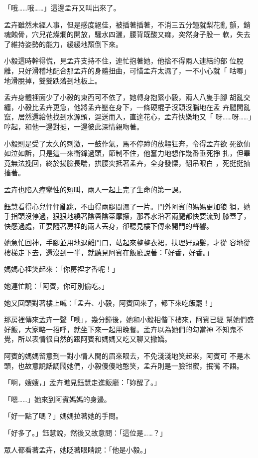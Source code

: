 「哦……哦……」這邊孟卉又叫出來了。

孟卉雖然未經人事，但是感度絕佳，被插著插著，不消三五分鐘就梨花亂
顫，銷魂蝕骨，穴兒花燦爛的開放，騷水四灑，腰背既酸又痲，突然身子股一
軟，失去了維持姿勢的能力，緩緩地頹倒下來。

小毅這時幹得慌，見孟卉支持不住，連忙抱著她，他捨不得兩人連結的部
位脫離，只好滑稽地配合那孟卉的身體扭曲，可惜孟卉太濕了，一不小心就「
咕唧」地滑脫掉，雙雙跌落到地板上。

孟卉身體裡面少了小毅的東西可不依了，她轉身抱緊小毅，兩人八隻手腳
胡亂交纏，小毅比孟卉更急，他將孟卉壓在身下，一條硬棍子沒頭沒腦地在孟
卉腿間亂竄，居然還給他找到水源頭，逕送而入，直達花心，孟卉快樂地又「
呀……呀……」哼起，和他一邊對挺，一邊彼此深情親吻著。

小毅則是受了太久的刺激，一鼓作氣，馬不停蹄的放韁狂奔，令得孟卉欲
死欲仙如泣如訴，只是這一來衝鋒過頭，節制不住，他奮力地想作幾番垂死掙
扎，但畢竟無法挽回，終於揚臉長喘，拱腰突抵著孟卉，全身發慄，翻吊眼白
，死挺挺抽搐著。

孟卉也陷入痙攣性的短叫，兩人一起上完了生命的第一課。

鈺慧看得心兒怦怦亂跳，不由得兩腿間濕了一片。門外阿賓的媽媽更加狼
狽，她手指頭沒停過，狠狠地繞著陰唇陰蒂摩擦，那春水沿著兩腿都快要流到
膝蓋了，快感過處，正要隨著房裡的兩人丟身，卻聽見樓下傳來開門的聲響。

她急忙回神，手腳並用地退離門口，站起來整整衣裙，扶理好頭髮，才從
容地從樓梯走下去，還沒到一半，就聽見阿賓在飯廳說著：「好香，好香。」

媽媽心裡笑起來：「你房裡才香呢！」

她連忙說：「阿賓，你可別偷吃。」

她又回頭對著樓上喊：「孟卉、小毅，阿賓回來了，都下來吃飯罷！」

那房裡傳來孟卉一聲「噢」，幾分鐘後，她和小毅相偕下樓來，阿賓已經
幫她們盛好飯，大家略一招呼，就坐下來一起用晚餐。孟卉以為她們的勾當神
不知鬼不覺，所以表情很自然的跟阿賓和媽媽又吃又聊又撒嬌。

阿賓的媽媽留意到一對小情人間的眉來眼去，不免淺淺地笑起來，阿賓可
不是木頭，也故意說話調鬧她們，小毅傻傻地憨笑，孟卉則是一臉甜蜜，抿嘴
不語。

「啊，嫂嫂，」孟卉瞧見鈺慧走進飯廳：「妳醒了。」

「嗯……」她來到阿賓媽媽的身邊。

「好一點了嗎？」媽媽拉著她的手問。

「好多了。」鈺慧說，然後又故意問：「這位是……？」

眾人都看著孟卉，她眨著眼睛說：「他是小毅。」

